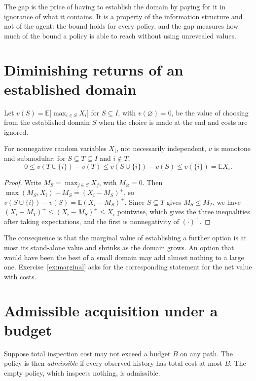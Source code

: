 The gap is the price of having to establish the domain by paying for it in ignorance of what it contains. It is a property of the information structure and not of the agent: the bound holds for every policy, and the gap measures how much of the bound a policy is able to reach without using unrevealed values.

\section{Diminishing returns of an established domain}

Let $v(S)=\mathbb E\bigl[\max_{i\in S}X_i\bigr]$ for $S\subseteq I$, with $v(\varnothing)=0$, be the value of choosing from the established domain $S$ when the choice is made at the end and costs are ignored.

\begin{newresult}\label{prop:submodular}
For nonnegative random variables $X_i$, not necessarily independent, $v$ is monotone and submodular: for $S\subseteq T\subseteq I$ and $i\notin T$,
\[
0\le v(T\cup\{i\})-v(T)\le v(S\cup\{i\})-v(S)\le v(\{i\})=\mathbb E X_i.
\]
\end{newresult}
\begin{proof}
Write $M_S=\max_{j\in S}X_j$, with $M_\varnothing=0$. Then $\max(M_S,X_i)-M_S=(X_i-M_S)^{+}$, so $v(S\cup\{i\})-v(S)=\mathbb E(X_i-M_S)^{+}$. Since $S\subseteq T$ gives $M_S\le M_T$, we have $(X_i-M_T)^{+}\le(X_i-M_S)^{+}\le X_i$ pointwise, which gives the three inequalities after taking expectations, and the first is nonnegativity of $(\cdot)^{+}$.
\end{proof}

The consequence is that the marginal value of establishing a further option is at most its stand-alone value and shrinks as the domain grows. An option that would have been the best of a small domain may add almost nothing to a large one. Exercise~\ref{ex:marginal} asks for the corresponding statement for the net value with costs.

\section{Admissible acquisition under a budget}

Suppose total inspection cost may not exceed a budget $B$ on any path. The policy is then \emph{admissible} if every observed history has total cost at most $B$. The empty policy, which inspects nothing, is admissible.

